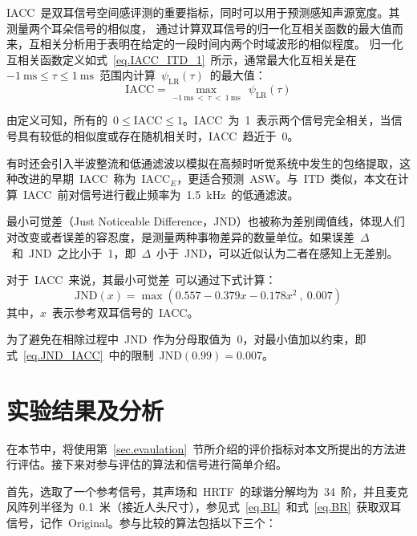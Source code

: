 IACC~是双耳信号空间感评测的重要指标，同时可以用于预测感知声源宽度。其测量两个耳朵信号的相似度， 通过计算双耳信号的归一化互相关函数的最大值而来，互相关分析用于表明在给定的一段时间内两个时域波形的相似程度。 归一化互相关函数定义如式~\eqref{eq.IACC_ITD_1}~所示，通常最大化互相关是在~$-1\mathrm{~ms} \leq \tau \leq 1\mathrm{~ms} $~范围内计算~$\psi_{\text{LR}}(\tau)$~的最大值：
\begin{equation}
\mathrm{IACC} = \underset{-1 \mathrm{~ms}~<~\tau~<~1 \mathrm{~ms}}{\operatorname{max}} ~~\psi_{\text{LR}}(\tau)
\end{equation}

由定义可知，所有的~$0 \leq \text{IACC} \leq 1$。IACC~为~1~表示两个信号完全相关，当信号具有较低的相似度或存在随机相关时，IACC~趋近于~0。

有时还会引入半波整流和低通滤波以模拟在高频时听觉系统中发生的包络提取，这种改进的早期~IACC~称为~$\mathrm{IACC}_{E}$，更适合预测~ASW。与~ITD~类似，本文在计算~IACC~前对信号进行截止频率为~1.5~kHz~的低通滤波。

最小可觉差（Just Noticeable Difference，JND）也被称为差别阈值线，体现人们对改变或者误差的容忍度，是测量两种事物差异的数量单位。如果误差~$\Delta$~和~JND~之比小于~1，即~$\Delta$~小于~JND，可以近似认为二者在感知上无差别。

对于~IACC~来说，其最小可觉差~可以通过下式计算：
\begin{equation}\label{eq.JND_IACC}
\mathrm{JND}(x)=\max \left( 0.557-0.379 x-0.178 x^{2}~, ~0.007 \right)
\end{equation}
其中，$x$~表示参考双耳信号的~IACC。

为了避免在相除过程中~JND~作为分母取值为~0，对最小值加以约束，即式~\eqref{eq.JND_IACC}~中的限制~JND$(0.99)=0.007$。


\section{实验结果及分析}

在本节中，将使用第~\ref{sec.evaulation}~节所介绍的评价指标对本文所提出的方法进行评估。接下来对参与评估的算法和信号进行简单介绍。

首先，选取了一个参考信号，其声场和~HRTF~的球谐分解均为~34~阶，并且麦克风阵列半径为~0.1~米（接近人头尺寸），参见式~\eqref{eq.BL}~和式~\eqref{eq.BR}~获取双耳信号，记作~Original。参与比较的算法包括以下三个：

